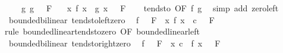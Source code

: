 \begin{isabellebody}
\ \ \ \ \ g{\isacharcolon}{\kern0pt}\ {\isachardoublequoteopen}{\isacharparenleft}{\kern0pt}g\ {\isasymlonglongrightarrow}\ {}{\isacharparenright}{\kern0pt}\ F{\isachardoublequoteclose}\isanewline
\ \ \ {\isachardoublequoteopen}{\isacharparenleft}{\kern0pt}{\isacharparenleft}{\kern0pt}{\isasymlambda}x{\isachardot}{\kern0pt}\ f\ x\ {\isacharasterisk}{\kern0pt}{\isacharasterisk}{\kern0pt}\ g\ x{\isacharparenright}{\kern0pt}\ {\isasymlonglongrightarrow}\ {}{\isacharparenright}{\kern0pt}\ F{\isachardoublequoteclose}\isanewline
%
\isadelimproof
\ \ %
\endisadelimproof
%
\isatagproof
{}\isamarkupfalse%
\ tendsto\ {\isacharbrackleft}{\kern0pt}OF\ f\ g{\isacharbrackright}{\kern0pt}\ \isamarkupfalse%
\ {\isacharparenleft}{\kern0pt}simp\ add{\isacharcolon}{\kern0pt}\ zero{\isacharunderscore}{\kern0pt}left{\isacharparenright}{\kern0pt}%
\endisatagproof
{\isafoldproof}%
%
\isadelimproof
\isanewline
%
\endisadelimproof
\isanewline
{}\isamarkupfalse%
\ {\isacharparenleft}{\kern0pt}\ bounded{\isacharunderscore}{\kern0pt}bilinear{\isacharparenright}{\kern0pt}\ tendsto{\isacharunderscore}{\kern0pt}left{\isacharunderscore}{\kern0pt}zero{\isacharcolon}{\kern0pt}\isanewline
\ \ {\isachardoublequoteopen}{\isacharparenleft}{\kern0pt}f\ {\isasymlonglongrightarrow}\ {}{\isacharparenright}{\kern0pt}\ F\ {\isasymLongrightarrow}\ {\isacharparenleft}{\kern0pt}{\isacharparenleft}{\kern0pt}{\isasymlambda}x{\isachardot}{\kern0pt}\ f\ x\ {\isacharasterisk}{\kern0pt}{\isacharasterisk}{\kern0pt}\ c{\isacharparenright}{\kern0pt}\ {\isasymlonglongrightarrow}\ {}{\isacharparenright}{\kern0pt}\ F{\isachardoublequoteclose}\isanewline
%
\isadelimproof
\ \ %
\endisadelimproof
%
\isatagproof
{}\isamarkupfalse%
\ {\isacharparenleft}{\kern0pt}rule\ bounded{\isacharunderscore}{\kern0pt}linear{\isachardot}{\kern0pt}tendsto{\isacharunderscore}{\kern0pt}zero\ {\isacharbrackleft}{\kern0pt}OF\ bounded{\isacharunderscore}{\kern0pt}linear{\isacharunderscore}{\kern0pt}left{\isacharbrackright}{\kern0pt}{\isacharparenright}{\kern0pt}%
\endisatagproof
{\isafoldproof}%
%
\isadelimproof
\isanewline
%
\endisadelimproof
\isanewline
{}\isamarkupfalse%
\ {\isacharparenleft}{\kern0pt}\ bounded{\isacharunderscore}{\kern0pt}bilinear{\isacharparenright}{\kern0pt}\ tendsto{\isacharunderscore}{\kern0pt}right{\isacharunderscore}{\kern0pt}zero{\isacharcolon}{\kern0pt}\isanewline
\ \ {\isachardoublequoteopen}{\isacharparenleft}{\kern0pt}f\ {\isasymlonglongrightarrow}\ {}{\isacharparenright}{\kern0pt}\ F\ {\isasymLongrightarrow}\ {\isacharparenleft}{\kern0pt}{\isacharparenleft}{\kern0pt}{\isasymlambda}x{\isachardot}{\kern0pt}\ c\ {\isacharasterisk}{\kern0pt}{\isacharasterisk}{\kern0pt}\ f\ x{\isacharparenright}{\kern0pt}\ {\isasymlonglongrightarrow}\ {}{\isacharparenright}{\kern0pt}\ F{\isachardoublequoteclose}\isanewline

\end{isabellebody}
